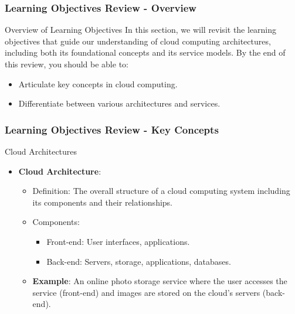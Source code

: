 \documentclass[aspectratio=169]{beamer}
\begin{document}
\begin{frame}[fragile]
    \frametitle{Learning Objectives Review - Overview}
    \begin{block}{Overview of Learning Objectives}
        In this section, we will revisit the learning objectives that guide our understanding of cloud computing architectures, including both its foundational concepts and its service models. 
        By the end of this review, you should be able to:
        \begin{itemize}
            \item Articulate key concepts in cloud computing.
            \item Differentiate between various architectures and services.
        \end{itemize}
    \end{block}
\end{frame}

\begin{frame}[fragile]
    \frametitle{Learning Objectives Review - Key Concepts}
    \begin{block}{Cloud Architectures}
        \begin{itemize}
            \item \textbf{Cloud Architecture}:
            \begin{itemize}
                \item Definition: The overall structure of a cloud computing system including its components and their relationships.
                \item Components: 
                \begin{itemize}
                    \item Front-end: User interfaces, applications.
                    \item Back-end: Servers, storage, applications, databases.
                \end{itemize}
                \item \textbf{Example}: An online photo storage service where the user accesses the service (front-end) and images are stored on the cloud's servers (back-end).
            \end{itemize}
        \end{itemize}
    \end{block}
\end{frame}
\end{document}
